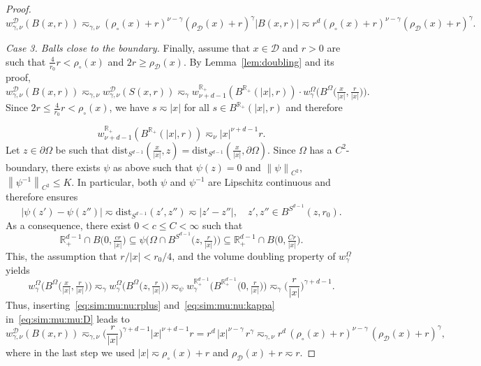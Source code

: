 \documentclass[12pt,a4paper, reqno]{amsart}
\theoremstyle{plain}
\theoremstyle{definition}
\theoremstyle{remark}
\numberwithin{equation}{section}
\newcommand{\1}{\mathbbm{1}}
\newcommand{\R}{\ensuremath{\mathbb{R}}}
\newcommand{\calD}{\ensuremath{\mathcal{D}}}
\newcommand{\nrm}[1]{\left\lVert #1 \right\rVert}
\begin{document}
\begin{proof}
\[
w_{\gamma,\nu}^\calD(B(x,r))\eqsim_{\gamma,\nu}(\rho_\circ(x)+r)^{\nu-\gamma}(\rho_\calD(x)+r)^\gamma |B(x,r)| \eqsim r^d(\rho_\circ(x)+r)^{\nu-\gamma}(\rho_\calD(x)+r)^\gamma.
\]

\medskip

\noindent \emph{Case 3. Balls close to the boundary.} Finally, assume that $x\in\calD$ and $r>0$ are such that $\frac{4}{r_0} r<\rho_\circ(x)$ and $2r\geq \rho_\calD(x)$. 
By Lemma~\ref{lem:doubling} and its proof,
\begin{equation}\label{eq:sim:mu:mu:D}
w_{\gamma,\nu}^\calD(B(x,r))
\eqsim_{\gamma,\nu}
 w_{\gamma,\nu}^\calD(S(x,r))
\eqsim_\gamma
w_{\nu+d-1}^{\R_+}(B^{\R_+}(\lvert x\rvert,r)) \cdot     w_\gamma^{\Omega}\Big(B^{\Omega}\big(\tfrac{x}{|x|},\tfrac{r}{\lvert x\rvert}\big)\Big).
\end{equation}
Since $2r\leq \frac{4}{r_0} r<\rho_\circ(x)$, we have $s\eqsim |x|$ for all $s\in B^{\R_+}(\lvert x\rvert,r)$ and therefore

\begin{equation}\label{eq:sim:mu:nu:rplus}
w_{\nu+d-1}^{\R_+}(B^{\R_+}(\lvert x\rvert,r))
\eqsim_\nu
\lvert x\rvert^{\nu+d-1} r.
\end{equation}
Let $z\in \partial \Omega$ be such that $\mathrm{dist}_{S^{d-1}}(\frac{x}{|x|}, z)=\mathrm{dist}_{S^{d-1}}(\frac{x}{|x|}, \partial\Omega)$. 
Since $\Omega$ has a $C^2$-boundary, there exists $\psi$ as above such that $\psi(z)=0$ and $\nrm{\psi}_{C^2},$ $ \nrm{\psi^{-1}}_{C^2}\le K$. In particular, both $\psi$ and $\psi^{-1}$ are Lipschitz continuous and therefore \cite[Lemma 3.24]{Grigoryan2009_Book} ensures 
\[|\psi(z')-\psi(z'')| \eqsim \mathrm{dist}_{S^{d-1}}(z',z'')\eqsim |z'-z''|, \quad z',z'' \in B^{S^{d-1}}(z,r_0).\]
As a consequence,
there exist $0<c\le C<\infty$ such that 
\[\R^{d-1}_+\cap B\big(0,\tfrac{cr}{|x|}\big) \subseteq \psi\Big(\Omega\cap B^{S^{d-1}}\big(z,\tfrac{r}{|x|}\big)\Big)\subseteq\R^{d-1}_+\cap B\big(0, \tfrac{Cr}{|x|}\big).\]
This, the assumption that $ r/\lvert x\rvert <r_0/4$, and the volume doubling property of $w_\gamma^{\Omega}$ yields
\begin{equation}\label{eq:sim:mu:nu:kappa}
w_\gamma^{\Omega}\Big(B^{\Omega}\big(\tfrac{x}{|x|},\tfrac{r}{\lvert x\rvert}\big)\Big)
\eqsim_\gamma
w_\gamma^{\Omega}\Big(B^{\Omega}\big(z,\tfrac{r}{\lvert x\rvert}\big)\Big)
\eqsim_{\psi} w_\gamma^{\R^{d-1}_+}\Big(B^{\R^{d-1}_+}\big(0,\tfrac{r}{|x|}\big)\Big)
\eqsim_\gamma
\Big(\frac{r}{\lvert x\rvert}\Big)^{\gamma+d-1}.
\end{equation}
Thus, inserting~\eqref{eq:sim:mu:nu:rplus} and~\eqref{eq:sim:mu:nu:kappa} in~\eqref{eq:sim:mu:mu:D} leads to
\[
w_{\gamma,\nu}^\calD(B(x,r))
\eqsim_{\gamma,\nu}
\Big(\frac{r}{\lvert x\rvert}\Big)^{\gamma+d-1}
\lvert x\rvert^{\nu+d-1} r
=
r^d\, \lvert x\rvert^{\nu-\gamma}\, r^\gamma
\eqsim_{\gamma,\nu}
r^d\, (\rho_\circ(x)+r)^{\nu-\gamma}\, (\rho_\calD(x)+r)^\gamma,
\]
where in the last step we used $|x|\eqsim\rho_\circ(x)+r$ and $\rho_\calD(x)+r\eqsim r$.
\end{proof}
\end{document}
